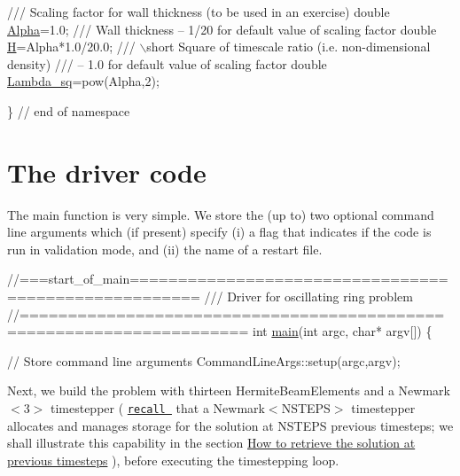 \begin{DoxyCodeInclude}

\textcolor{comment}{}
\textcolor{comment}{ /// Scaling factor for wall thickness (to be used in an exercise)}
\textcolor{comment}{} \textcolor{keywordtype}{double} \hyperlink{namespaceGlobal__Physical__Variables_aa2e802ee7cc8e1ac900ba94c3ce86eb7}{Alpha}=1.0;
\textcolor{comment}{}
\textcolor{comment}{ /// Wall thickness -- 1/20 for default value of scaling factor}
\textcolor{comment}{} \textcolor{keywordtype}{double} \hyperlink{namespaceGlobal__Physical__Variables_af6e07423e22c0991084d9a2f43727805}{H}=Alpha*1.0/20.0;
\textcolor{comment}{}
\textcolor{comment}{ /// \(\backslash\)short Square of timescale ratio (i.e. non-dimensional density)  }
\textcolor{comment}{ /// -- 1.0 for default value of scaling factor}
\textcolor{comment}{} \textcolor{keywordtype}{double} \hyperlink{namespaceGlobal__Physical__Variables_a6fe17557ceb32dd353827fba60408363}{Lambda\_sq}=pow(Alpha,2);

\} \textcolor{comment}{// end of namespace}

\end{DoxyCodeInclude}




 

\hypertarget{index_main}{}\section{The driver code}\label{index_main}
The main function is very simple. We store the (up to) two optional command line arguments which (if present) specify (i) a flag that indicates if the code is run in validation mode, and (ii) the name of a restart file.


\begin{DoxyCodeInclude}
\textcolor{comment}{//===start\_of\_main=====================================================}
\textcolor{comment}{/// Driver for oscillating ring problem }
\textcolor{comment}{}\textcolor{comment}{//=====================================================================}
\textcolor{keywordtype}{int} \hyperlink{lin__unsteady__ring_8cc_a0ddf1224851353fc92bfbff6f499fa97}{main}(\textcolor{keywordtype}{int} argc, \textcolor{keywordtype}{char}* argv[])
\{

 \textcolor{comment}{// Store command line arguments}
 CommandLineArgs::setup(argc,argv);

\end{DoxyCodeInclude}


Next, we build the problem with thirteen {\ttfamily Hermite\+Beam\+Elements} and a {\ttfamily Newmark$<$3$>$} timestepper ( \href{../../../linear_wave/two_d_linear_wave/html/index.html#IC}{\tt recall } that a {\ttfamily Newmark$<$\+N\+S\+T\+E\+P\+S$>$} timestepper allocates and manages storage for the solution at {\ttfamily N\+S\+T\+E\+PS} previous timesteps; we shall illustrate this capability in the section \hyperlink{index_prev}{How to retrieve the solution at previous timesteps} ), before executing the timestepping loop.


